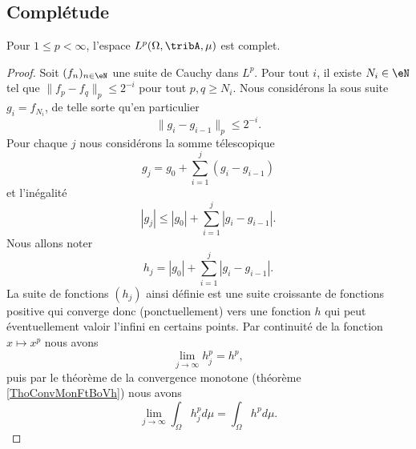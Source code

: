 \subsection{Complétude}

\begin{theorem}  \label{ThoUYBDWQX}
    Pour \( 1\leq p<\infty\), l'espace \( L^p(\Omega,\tribA,\mu)\) est complet.
\end{theorem}

\begin{proof}
    Soit \( (f_n)_{n\in\eN}\) une suite de Cauchy dans \( L^p\). Pour tout \( i\), il existe \( N_i\in\eN\) tel que $\| f_p-f_q \|_p\leq 2^{-i}$ pour tout \( p,q\geq N_i\). Nous considérons la sous suite \( g_i=f_{N_i}\), de telle sorte qu'en particulier
    \begin{equation}    \label{EqJLoDID}
        \|g_i-g_{i-1}\|_p\leq 2^{-i}.
    \end{equation}
    Pour chaque \( j\) nous considérons la somme télescopique
    \begin{equation}
        g_j=g_0+\sum_{i=1}^j(g_i-g_{i-1})
    \end{equation}
    et l'inégalité
    \begin{equation}
        | g_j |\leq | g_0 |+\sum_{i=1}^j| g_i-g_{i-1} |.
    \end{equation}
    Nous allons noter
    \begin{equation}        \label{EqSomPaFPQOWC}
        h_j=| g_0 |+\sum_{i=1}^j| g_i-g_{i-1} |.
    \end{equation}
    La suite de fonctions \( (h_j)\) ainsi définie est une suite croissante de fonctions positive qui converge donc (ponctuellement) vers une fonction \( h\) qui peut éventuellement valoir l'infini en certains points. Par continuité de la fonction \( x\mapsto x^p\) nous avons
    \begin{equation}
        \lim_{j\to \infty} h_j^p=h^p,
    \end{equation}
    puis par le théorème de la convergence monotone (théorème \ref{ThoConvMonFtBoVh}) nous avons
    \begin{equation}
        \lim_{j\to \infty} \int_{\Omega}h_j^pd\mu=\int_{\Omega}h^pd\mu.
    \end{equation}

\end{proof}
